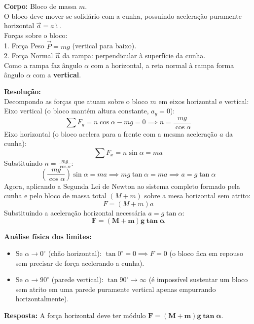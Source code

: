 \documentclass[11pt,a4paper]{article}
\begin{document}
\begin{dclbox}
\textbf{Corpo:} Bloco de massa $m$.\\
O bloco deve mover-se solidário com a cunha, possuindo aceleração puramente horizontal $\vec{a} = a\hat{\imath}$.\\
Forças sobre o bloco:\\
1. Força Peso $\vec{P} = mg$ (vertical para baixo).\\
2. Força Normal $\vec{n}$ da rampa: perpendicular à superfície da cunha.\\
Como a rampa faz ângulo $\alpha$ com a horizontal, a reta normal à rampa forma ângulo $\alpha$ com a \textbf{vertical}.
\end{dclbox}

\noindent
\textbf{Resolução:}\\
Decompondo as forças que atuam sobre o bloco $m$ em eixos horizontal e vertical:\\
Eixo vertical (o bloco mantém altura constante, $a_y = 0$):
\[ \sum F_y = n \cos\alpha - mg = 0 \implies n = \frac{mg}{\cos\alpha} \]
Eixo horizontal (o bloco acelera para a frente com a mesma aceleração $a$ da cunha):
\[ \sum F_x = n \sin\alpha = m a \]
Substituindo $n = \frac{mg}{\cos\alpha}$:
\[ \left(\frac{mg}{\cos\alpha}\right)\sin\alpha = m a \implies mg \tan\alpha = m a \implies a = g \tan\alpha \]
Agora, aplicando a Segunda Lei de Newton ao sistema completo formado pela cunha e pelo bloco de massa total $(M + m)$ sobre a mesa horizontal sem atrito:
\[ F = (M + m) a \]
Substituindo a aceleração horizontal necessária $a = g\tan\alpha$:
\[ \mathbf{F = (M + m) g \tan\alpha} \]

\begin{dica}
\textbf{Análise física dos limites:}
\begin{itemize}
    \item Se $\alpha \to 0^\circ$ (chão horizontal): $\tan 0^\circ = 0 \implies F = 0$ (o bloco fica em repouso sem precisar de força acelerando a cunha).
    \item Se $\alpha \to 90^\circ$ (parede vertical): $\tan 90^\circ \to \infty$ (é impossível sustentar um bloco sem atrito em uma parede puramente vertical apenas empurrando horizontalmente).
\end{itemize}
\end{dica}

\noindent
\textbf{Resposta:} A força horizontal deve ter módulo $\mathbf{F = (M + m) g \tan\alpha}$.
\end{document}
